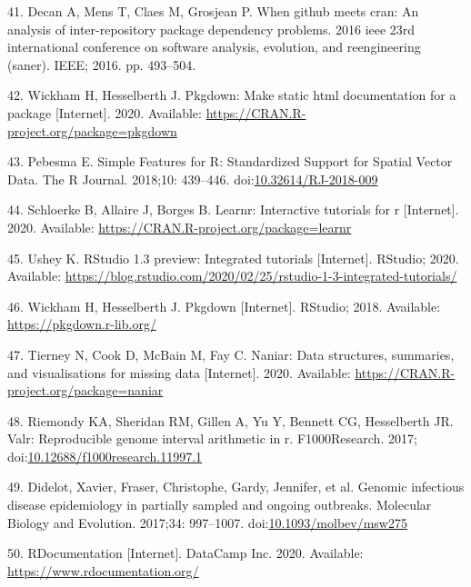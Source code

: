 \documentclass[10pt,letterpaper]{article}
\begin{document}
\leavevmode\hypertarget{ref-decan2016}{}%
41. Decan A, Mens T, Claes M, Grosjean P. When github meets cran: An
analysis of inter-repository package dependency problems. 2016 ieee 23rd
international conference on software analysis, evolution, and
reengineering (saner). IEEE; 2016. pp. 493--504.

\leavevmode\hypertarget{ref-pkgdown}{}%
42. Wickham H, Hesselberth J. Pkgdown: Make static html documentation
for a package {[}Internet{]}. 2020. Available:
\url{https://CRAN.R-project.org/package=pkgdown}

\leavevmode\hypertarget{ref-sf}{}%
43. Pebesma E. Simple Features for R: Standardized Support for Spatial
Vector Data. The R Journal. 2018;10: 439--446.
doi:\href{https://doi.org/10.32614/RJ-2018-009}{10.32614/RJ-2018-009}

\leavevmode\hypertarget{ref-learnr}{}%
44. Schloerke B, Allaire J, Borges B. Learnr: Interactive tutorials for
r {[}Internet{]}. 2020. Available:
\url{https://CRAN.R-project.org/package=learnr}

\leavevmode\hypertarget{ref-ushey2020}{}%
45. Ushey K. RStudio 1.3 preview: Integrated tutorials {[}Internet{]}.
RStudio; 2020. Available:
\url{https://blog.rstudio.com/2020/02/25/rstudio-1-3-integrated-tutorials/}

\leavevmode\hypertarget{ref-pkgdownweb}{}%
46. Wickham H, Hesselberth J. Pkgdown {[}Internet{]}. RStudio; 2018.
Available: \url{https://pkgdown.r-lib.org/}

\leavevmode\hypertarget{ref-naniar}{}%
47. Tierney N, Cook D, McBain M, Fay C. Naniar: Data structures,
summaries, and visualisations for missing data {[}Internet{]}. 2020.
Available: \url{https://CRAN.R-project.org/package=naniar}

\leavevmode\hypertarget{ref-valr}{}%
48. Riemondy KA, Sheridan RM, Gillen A, Yu Y, Bennett CG, Hesselberth
JR. Valr: Reproducible genome interval arithmetic in r. F1000Research.
2017;
doi:\href{https://doi.org/10.12688/f1000research.11997.1}{10.12688/f1000research.11997.1}

\leavevmode\hypertarget{ref-TransPhylo}{}%
49. Didelot, Xavier, Fraser, Christophe, Gardy, Jennifer, et al. Genomic
infectious disease epidemiology in partially sampled and ongoing
outbreaks. Molecular Biology and Evolution. 2017;34: 997--1007.
doi:\href{https://doi.org/10.1093/molbev/msw275}{10.1093/molbev/msw275}

\leavevmode\hypertarget{ref-rdocumentation}{}%
50. RDocumentation {[}Internet{]}. DataCamp Inc. 2020. Available:
\url{https://www.rdocumentation.org/}
\end{document}
